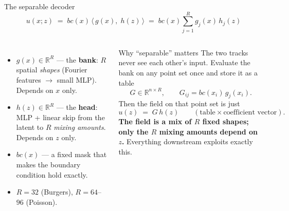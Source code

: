 \documentclass[10pt,aspectratio=169]{beamer}
\newcommand{\R}{\mathbb{R}}
\begin{document}
\begin{frame}{The separable decoder}
  \[
    u(x;z) \;=\; bc(x)\,\big\langle\, g(x),\; h(z)\,\big\rangle
    \;=\; bc(x)\sum_{j=1}^{R} g_j(x)\,h_j(z)
  \]
  \begin{columns}[T]
    \begin{itemize}
      \item $g(x)\in\R^{R}$ --- the \textbf{bank}: $R$ spatial \emph{shapes} (Fourier features $\to$ small MLP). Depends on $x$ only.
      \item $h(z)\in\R^{R}$ --- the \textbf{head}: MLP + linear skip from the latent to $R$ \emph{mixing amounts}. Depends on $z$ only.
      \item $bc(x)$ --- a fixed mask that makes the boundary condition hold exactly.
      \item $R=32$ (Burgers), $R=64$--$96$ (Poisson).
    \end{itemize}
    \begin{block}{Why ``separable'' matters}
      The two tracks never see each other's input. Evaluate the bank on any point set once and store it as a table
      \[
        G \in \R^{n\times R},\qquad G_{ij} = bc(x_i)\,g_j(x_i).
      \]
      Then the field on that point set is just
      \[
        u(z) \;=\; G\,h(z) \qquad(\text{table}\times\text{coefficient vector}).
      \]
      \textbf{The field is a mix of $R$ fixed shapes; only the $R$ mixing amounts depend on $z$.}
      Everything downstream exploits exactly this.
    \end{block}
  \end{columns}
\end{frame}
\end{document}
